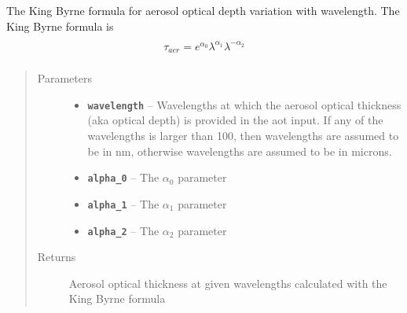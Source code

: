 \documentclass[a4paper,10pt,english]{sphinxmanual}
\begin{document}
\begin{fulllineitems}
\label{packages:librad.king_byrne_formula}
The King Byrne formula for aerosol optical depth variation with wavelength.
The King Byrne formula is
\begin{align*}\begin{aligned}
\begin{split}\tau_{aer}=e^{\alpha_{0}}\lambda^{\alpha_{1}}\lambda^{-\alpha_{2}}\end{split}\end{aligned}\end{align*}\begin{quote}\begin{description}
\item[{Parameters}] \leavevmode\begin{itemize}
\item {} 
\textbf{\texttt{wavelength}} -- Wavelengths at which the aerosol optical thickness (aka optical depth) is provided in the aot
input. If any of the wavelengths is larger than 100, then wavelengths are assumed to be in nm, otherwise
wavelengths are assumed to be in microns.

\item {} 
\textbf{\texttt{alpha\_0}} -- The \(\alpha_0\) parameter

\item {} 
\textbf{\texttt{alpha\_1}} -- The \(\alpha_1\) parameter

\item {} 
\textbf{\texttt{alpha\_2}} -- The \(\alpha_2\) parameter

\end{itemize}

\item[{Returns}] \leavevmode
Aerosol optical thickness at given wavelengths calculated with the King Byrne formula

\end{description}\end{quote}

\end{fulllineitems}

\end{document}
